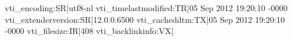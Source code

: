 vti_encoding:SR|utf8-nl
vti_timelastmodified:TR|05 Sep 2012 19:20:10 -0000
vti_extenderversion:SR|12.0.0.6500
vti_cacheddtm:TX|05 Sep 2012 19:20:10 -0000
vti_filesize:IR|408
vti_backlinkinfo:VX|
